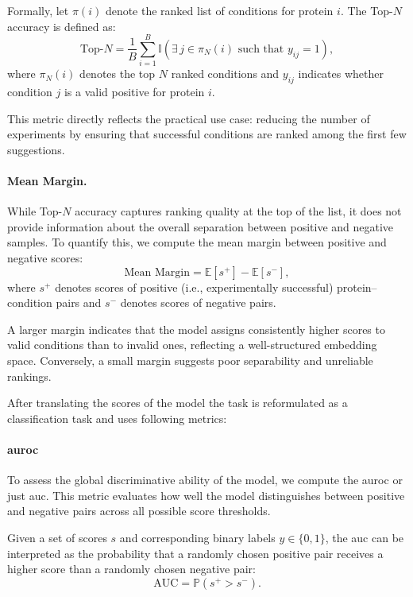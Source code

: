 Formally, let $\pi(i)$ denote the ranked list of conditions for protein $i$. The Top-$N$ accuracy is defined as:
\begin{equation}
    \text{Top-}N = \frac{1}{B} \sum_{i=1}^{B}
    \mathbb{I}\left(\exists\, j \in \pi_N(i) \text{ such that } y_{ij} = 1 \right),
\end{equation}
where $\pi_N(i)$ denotes the top $N$ ranked conditions and $y_{ij}$ indicates whether condition $j$ is a valid positive for protein $i$.

This metric directly reflects the practical use case: reducing the number of experiments by ensuring that successful conditions are ranked among the first few suggestions.

\paragraph{Mean Margin.}
While Top-$N$ accuracy captures ranking quality at the top of the list, it does not provide information about the overall separation between positive and negative samples. To quantify this, we compute the mean margin between positive and negative scores:
\begin{equation}
    \text{Mean Margin} =
    \mathbb{E}[s^{+}] - \mathbb{E}[s^{-}],
\end{equation}
where $s^{+}$ denotes scores of positive (i.e., experimentally successful) protein--condition pairs and $s^{-}$ denotes scores of negative pairs.

A larger margin indicates that the model assigns consistently higher scores to valid conditions than to invalid ones, reflecting a well-structured embedding space. Conversely, a small margin suggests poor separability and unreliable rankings.

After translating the scores of the model the task is reformulated as a classification task and uses following metrics: 

\paragraph{\gls{auroc}}
To assess the global discriminative ability of the model, we compute the \gls{auroc} or just \gls{auc}. This metric evaluates how well the model distinguishes between positive and negative pairs across all possible score thresholds.

Given a set of scores $s$ and corresponding binary labels $y \in \{0,1\}$, the \gls{auc} can be interpreted as the probability that a randomly chosen positive pair receives a higher score than a randomly chosen negative pair:
\begin{equation}
    \text{AUC} = \mathbb{P}(s^{+} > s^{-}).
\end{equation}


